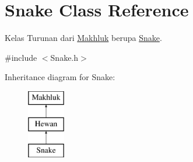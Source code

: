 \hypertarget{class_snake}{}\section{Snake Class Reference}
\label{class_snake}


Kelas Turunan dari \hyperlink{class_makhluk}{Makhluk} berupa \hyperlink{class_snake}{Snake}.  




{\ttfamily \#include $<$Snake.\+h$>$}

Inheritance diagram for Snake\+:\begin{figure}[H]
\begin{center}
\leavevmode
\includegraphics[height=3.000000cm]{class_snake}
\end{center}
\end{figure}
